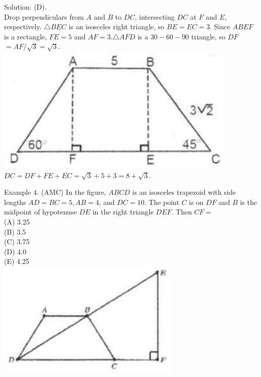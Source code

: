 \documentclass[10pt]{article}
\begin{document}
Solution: (D).\\
Drop perpendiculars from \(A\) and \(B\) to \(D C\), intersecting \(D C\) at \(F\) and \(E\), respectively. \(\triangle B E C\) is an isosceles right triangle, so \(B E=E C=3\). Since \(A B E F\) is a rectangle, \(F E=5\) and \(A F=3 . \triangle A F D\) is a \(30-60-90\) triangle, so \(D F\) \(=A F / \sqrt{3}=\sqrt{3}\).\\
\includegraphics[max width=\textwidth, center]{2025_04_17_97bc1f7e44d93c271a88g-076(2)}\\
\(D C=D F+F E+E C=\sqrt{3}+5+3=8+\sqrt{3}\).

Example 4. (AMC) In the figure, \(A B C D\) is an isosceles trapezoid with side lengths \(A D=B C=5, A B=4\), and \(D C=10\). The point \(C\) is on \(D F\) and \(B\) is the midpoint of hypotenuse \(\overline{D E}\) in the right triangle \(D E F\). Then \(C F=\)\\
(A) 3.25\\
(B) 3.5\\
(C) 3.75\\
(D) 4.0\\
(E) 4.25\\
\includegraphics[max width=\textwidth, center]{2025_04_17_97bc1f7e44d93c271a88g-076(1)}
\end{document}
